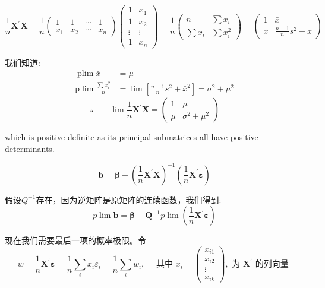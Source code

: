 $$ \frac{1}{n}  \boldsymbol{X^{\prime} X} = \frac{1}{n}\left(\begin{array}{cccc}
    1 & 1 & \cdots & 1 \\
    x_{1} & x_{2} & \cdots & x_{n}
    \end{array}\right)\left(\begin{array}{cc}
    1 & x_{1} \\
    1 & x_{2} \\
    \vdots & \vdots \\
    1 & x_{n}
    \end{array}\right)=\frac{1}{n}\left(\begin{array}{cc}
    n & \sum x_{i} \\
    \sum x_{i} & \sum x_{i}^{2}
    \end{array}\right)=\left(\begin{array}{cc}
    1 & \bar{x} \\
    \bar{x} & \frac{n-1}{n} s^{2}+\bar{x}
    \end{array}\right) $$

    我们知道:
$$ \begin{aligned}
        \operatorname{plim} \bar{x} & = \mu \\
        \mathrm{p} \lim \frac{\sum x_{i}^{2}}{n} & =\lim \left[\frac{n-1}{n} s^{2}+\bar{x}^{2}\right]=\sigma^{2}+\mu^{2}
    \end{aligned} $$
$$ \therefore \qquad 
    \lim \frac{1}{n}  \boldsymbol{X^{\prime} X} = \left(\begin{array}{cc}
    1 & \mu \\
    \mu & \sigma^{2}+\mu^{2}
    \end{array}\right)  $$

    which is positive definite as its principal submatrices all have positive determinants.

    \begin{equation}
        \boldsymbol{b} =  \boldsymbol{\beta} + \left(\frac{1}{n}  \boldsymbol{X^{\prime} X} \right)^{-1}
        \left(\frac{1}{n}  \boldsymbol{X^{\prime} \varepsilon} \right) 
    \end{equation}

    假设$ Q^{-1} $存在，因为逆矩阵是原矩阵的连续函数，我们得到:
    $$ p \lim  \boldsymbol{b} =  \boldsymbol{\beta} +  \boldsymbol{Q^{-1}}
             p \lim \left(\frac{1}{n}  \boldsymbol{X^{\prime} \varepsilon} \right) $$

    现在我们需要最后一项的概率极限。令
    $$ \bar{w}=\frac{1}{n}  \boldsymbol{X^{\prime} \varepsilon}
        =\frac{1}{n} \sum_{i} x_{i} \varepsilon_{i}=\frac{1}{n} \sum_{i} w_{i}, \quad \text { 其中 } x_{i}=\left(\begin{array}{c}
        x_{i 1} \\
        x_{i 2} \\
        \vdots \\
        x_{i k}
        \end{array}\right), \text { 为 }  \boldsymbol{X^{\prime}} \text { 的列向量 } $$

